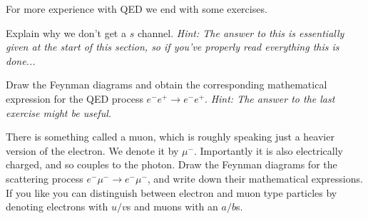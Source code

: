 For more experience with QED we end with some exercises.

\bbox 
    Explain why we don't get a $s$ channel. \textit{Hint: The answer to this is essentially given at the start of this section, so if you've properly read everything this is done...}
\ebox  

\bbox 
    Draw the Feynman diagrams and obtain the corresponding mathematical expression for the QED process $e^-e^+\to e^-e^+$. \textit{Hint: The answer to the last exercise might be useful.}
\ebox 

\bbox 
    There is something called a muon, which is roughly speaking just a heavier version of the electron. We denote it by $\mu^-$. Importantly it is also electrically charged, and so couples to the photon. Draw the Feynman diagrams for the scattering process $e^-\mu^-\to e^-\mu^-$, and write down their mathematical expressions. If you like you can distinguish between electron and muon type particles by denoting electrons with $u/v$s and muons with an $a/b$s.
\ebox